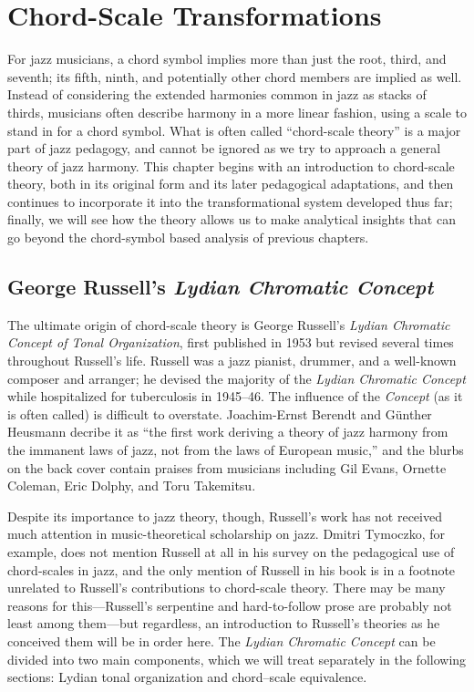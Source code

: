 
\chapter{Chord-Scale Transformations}
\label{chap:chord-scale-transformations}
\addtocspace


For jazz musicians, a chord symbol implies more than just the root, third, and
seventh; its fifth, ninth, and potentially other chord members are implied as
well. Instead of considering the extended harmonies common in jazz as stacks
of thirds, musicians often describe harmony in a more linear fashion, using a
scale to stand in for a chord symbol. What is often called ``chord-scale
theory'' is a major part of jazz pedagogy, and cannot be ignored as we try to
approach a general theory of jazz harmony. This chapter begins with an
introduction to chord-scale theory, both in its original form and its later
pedagogical adaptations, and then continues to incorporate it into the
transformational system developed thus far; finally, we will see how the
theory allows us to make analytical insights that can go beyond the
chord-symbol based analysis of previous chapters.

\section{George Russell’s \emph{Lydian Chromatic Concept}}
\label{sec:lcc}

The ultimate origin of chord-scale theory is George Russell's \emph{Lydian
  Chromatic Concept of Tonal Organization}, first published in 1953 but
revised several times throughout Russell's life. Russell was a jazz
pianist, drummer, and a well-known composer and arranger; he devised the
majority of the \emph{Lydian Chromatic Concept} while hospitalized for
tuberculosis in 1945--46. The influence of the \emph{Concept} (as it
is often called) is difficult to overstate. Joachim-Ernst Berendt and Günther
Heusmann decribe it as ``the first work deriving a theory of jazz harmony from
the immanent laws of jazz, not from the laws of European music,'' and the
blurbs on the back cover contain praises from musicians including Gil Evans,
Ornette Coleman, Eric Dolphy, and Toru Takemitsu.

Despite its importance to jazz theory, though, Russell's work has not received
much attention in music-theoretical scholarship on jazz. Dmitri Tymoczko, for
example, does not mention Russell at all in his survey on the pedagogical use
of chord-scales in jazz, and the only mention of Russell in his book is in a
footnote unrelated to Russell's contributions to chord-scale theory.
There may be many reasons for this---Russell's serpentine and hard-to-follow
prose are probably not least among them---but regardless, an introduction
to Russell's theories as he conceived them will be in order here. The
\emph{Lydian Chromatic Concept} can be divided into two main components, which
we will treat separately in the following sections: Lydian tonal organization and
chord--scale equivalence.

